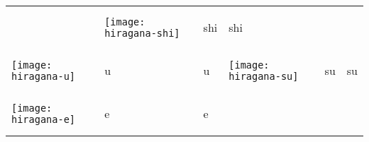\documentclass[a4paper,12pt]{extarticle}
\begin{document}
\begin{longtable}{|lll|lll|}
	                                   &
	\begin{minipage}{0.2\textwidth}
		\centerline{
			\texttt{[image: hiragana-shi]}
		}
	\end{minipage}
	                                   &
	\begin{CJK}{UTF8}{min}shi\end{CJK}
	                                   &
	shi
	\\
	\begin{minipage}{0.2\textwidth}
		\centerline{
			\texttt{[image: hiragana-u]}
		}
	\end{minipage}
	                                   &
	\begin{CJK}{UTF8}{min}u\end{CJK}
	                                   &
	u

	                                   &
	\begin{minipage}{0.2\textwidth}
		\centerline{
			\texttt{[image: hiragana-su]}
		}
	\end{minipage}
	                                   &
	\begin{CJK}{UTF8}{min}su\end{CJK}
	                                   &
	su
	\\
	\begin{minipage}{0.2\textwidth}
		\centerline{
			\texttt{[image: hiragana-e]}
		}
	\end{minipage}
	                                   &
	\begin{CJK}{UTF8}{min}e\end{CJK}
	                                   &
	e


\end{longtable}
\end{document}
